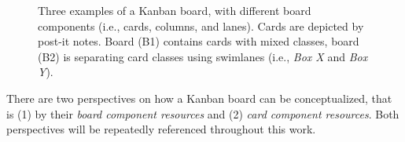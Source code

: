 \begin{figure}[ht]
	\centering {}
	\caption[Three Examples of a Kanban Board]{Three examples of a Kanban board, with different board components (i.e., cards, columns, and lanes). Cards are depicted by post-it notes. Board (B1) contains cards with mixed classes, board (B2) is separating card classes using swimlanes (i.e., \textit{Box X} and \textit{Box Y}).}
	\label{fig:Kanban Boards}
\end{figure}



\noindent There are two perspectives on how a Kanban board can be conceptualized, that is (1) by their \textit{board component resources} and (2) \textit{card component resources}. Both perspectives will be repeatedly referenced throughout this work.

